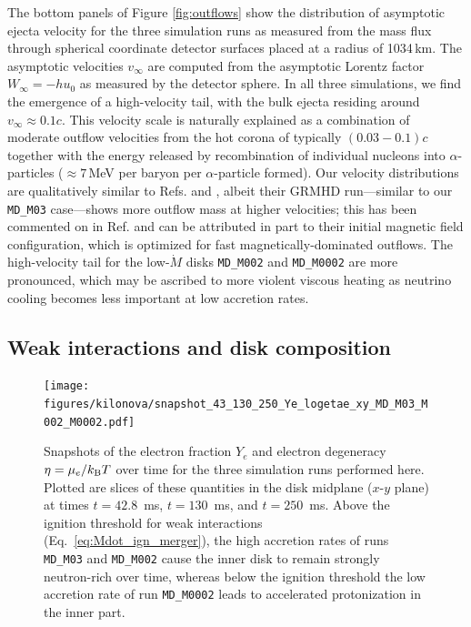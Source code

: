 The bottom panels of Figure \ref{fig:outflows} show the distribution of asymptotic ejecta velocity for the three simulation runs as measured from the mass flux through spherical coordinate detector surfaces placed at a radius of 1034\,km. The asymptotic velocities $v_\infty$ are computed from the asymptotic Lorentz factor $W_\infty = -hu_0$ as measured by the detector sphere. In all three simulations, we find the emergence of a high-velocity tail, with the bulk ejecta residing around $v_\infty\approx 0.1c$. This velocity scale is naturally explained as a combination of moderate outflow velocities from the hot corona of typically $(0.03-0.1)c$ together with the energy released by recombination of individual nucleons into $\alpha$-particles ($\approx\!7$\,MeV per baryon per $\alpha$-particle formed). Our velocity distributions are qualitatively similar to Refs. \cite{Fernandez:2018kax} and \cite{Christie:2019lim}, albeit their GRMHD run---similar to our \texttt{MD\_M03} case---shows more outflow mass at higher velocities; this has been commented on in Ref. \cite{Fernandez:2018kax} and can be attributed in part to their initial magnetic field configuration, which is optimized for fast magnetically-dominated outflows. The high-velocity tail for the low-$\dot{M}$ disks \texttt{MD\_M002} and \texttt{MD\_M0002} are more pronounced, which may be ascribed to more violent viscous heating as neutrino cooling becomes less important at low accretion rates.




\subsection{Weak interactions and disk composition}
\label{sec:disk_composition}

\begin{figure}[t]
\centering
  \texttt{[image: figures/kilonova/snapshot\_43\_130\_250\_Ye\_logetae\_xy\_MD\_M03\_M002\_M0002.pdf]}
 \caption{Snapshots of the electron fraction $Y_e$ and electron degeneracy $\eta=\mu_e/k_{\rm B}T$ over time for the three simulation runs performed here. Plotted are slices of these quantities in the disk midplane ($x$-$y$ plane) at times $t = 42.8$~ms, $t = 130$~ms, and $t = 250$~ms. Above the ignition threshold for weak interactions (Eq.~\eqref{eq:Mdot_ign_merger}), the high accretion rates of runs \texttt{MD\_M03} and \texttt{MD\_M002} cause the inner disk to remain strongly neutron-rich over time, whereas below the ignition threshold the low accretion rate of run \texttt{MD\_M0002} leads to accelerated protonization in the inner part. \label{fig:panels_Ye_eta}}
\vspace{5mm}
\end{figure}


